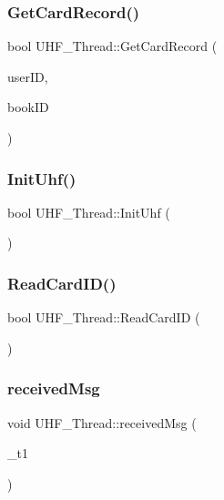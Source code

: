\mbox{\label{class_u_h_f___thread_af1bc225a4a6a68a1dd79eb7d8688648d}} 
\subsubsection{\texorpdfstring{GetCardRecord()}{GetCardRecord()}}
{\footnotesize\ttfamily bool U\+H\+F\+\_\+\+Thread\+::\+Get\+Card\+Record (\begin{DoxyParamCaption}\item[{Q\+String}]{user\+ID,  }\item[{Q\+String}]{book\+ID }\end{DoxyParamCaption})}

\mbox{\label{class_u_h_f___thread_a0bb3c8d9ac1290986ce318819dc4ecbf}} 
\subsubsection{\texorpdfstring{InitUhf()}{InitUhf()}}
{\footnotesize\ttfamily bool U\+H\+F\+\_\+\+Thread\+::\+Init\+Uhf (\begin{DoxyParamCaption}{ }\end{DoxyParamCaption})}

\mbox{\label{class_u_h_f___thread_a6dcb8fe026e47d35c7d992b860c86492}} 
\subsubsection{\texorpdfstring{ReadCardID()}{ReadCardID()}}
{\footnotesize\ttfamily bool U\+H\+F\+\_\+\+Thread\+::\+Read\+Card\+ID (\begin{DoxyParamCaption}{ }\end{DoxyParamCaption})}

\mbox{\label{class_u_h_f___thread_aa3b7dd0bbada4349d59821aab8a17927}} 
\subsubsection{\texorpdfstring{receivedMsg}{receivedMsg}}
{\footnotesize\ttfamily void U\+H\+F\+\_\+\+Thread\+::received\+Msg (\begin{DoxyParamCaption}\item[{Q\+Byte\+Array}]{\+\_\+t1 }\end{DoxyParamCaption})\hspace{0.3cm}{\ttfamily [signal]}}

